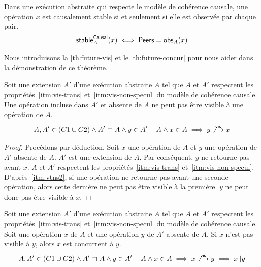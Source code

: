 \begin{theorem}\label{th:cs}
Dans une exécution abstraite qui respecte le modèle de cohérence causale, une opération $x$ est causalement stable si et seulement si elle est observée par chaque pair.
\begin{equation*}
    \operatorname{\mathsf{stable}}_A^{\operatorname{\mathsf{Causal}}}(x) \iff \operatorname{\mathsf{Peers}} = \operatorname{\mathsf{obs}}_A(x)
\end{equation*}
\end{theorem}

Nous introduisons la \autoref{th:future-vis} et le \autoref{th:future-concur} pour nous aider dans la démonstration de ce théorème.

\begin{proposition}\label{th:future-vis}
Soit une extension $A'$ d'une exécution abstraite $A$ tel que $A$ et $A'$ respectent les propriétés~\ref{itm:vis-trans} et~\ref{itm:vis-non-specul} du modèle de cohérence causale.
Une opération incluse dans $A'$ et absente de $A$ ne peut pas être visible à une opération de $A$.
\begin{equation*}
    A, A' \in (C1 \cup C2) \land A' \sqsupset A \land y \in A'- A \land x \in A \implies y \not\overset{\mathsf{vis}}{\longrightarrow} x
\end{equation*}
\end{proposition}

\begin{proof}
Procédons par déduction.
Soit $x$ une opération de $A$ et $y$ une opération de $A'$ absente de $A$.
$A'$ est une extension de $A$.
Par conséquent, $y$ ne retourne pas avant $x$.
$A$ et $A'$ respectent les propriétés~\ref{itm:vis-trans} et~\ref{itm:vis-non-specul}.
D'après~\ref{itm:vtns2}, si une opération ne retourne pas avant une seconde opération, alors cette dernière ne peut pas être visible à la première.
$y$ ne peut donc pas être visible à $x$.
\end{proof}

\begin{corollary}\label{th:future-concur}
Soit une extension $A'$ d'une exécution abstraite $A$ tel que $A$ et $A'$ respectent les propriétés~\ref{itm:vis-trans} et~\ref{itm:vis-non-specul} du modèle de cohérence causale.
Soit une opération $x$ de $A$ et une opération $y$ de $A'$ absente de $A$.
Si $x$ n'est pas visible à $y$, alors $x$ est concurrent à $y$.
\begin{equation*}
    A, A' \in (C1 \cup C2) \land A' \sqsupset A \land y \in A'- A \land x \in A \implies x \not\overset{\mathsf{vis}}{\longrightarrow} y \implies x \| y
\end{equation*}
\end{corollary}

